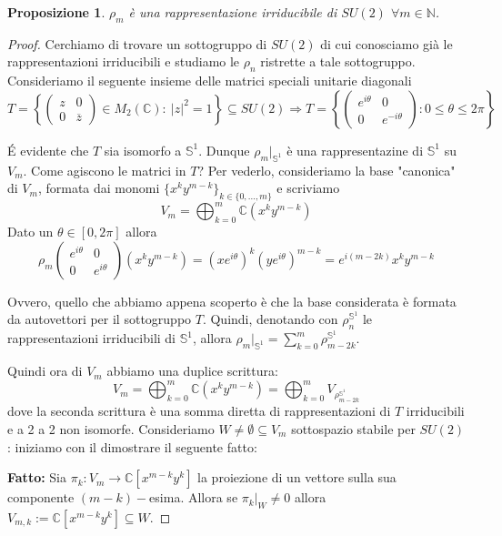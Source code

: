 \documentclass[11pt]{article}
\theoremstyle{plain}
\newtheorem{prop}[thm]{Proposizione}
\theoremstyle{definition}
\theoremstyle{remark}
\newcommand{\C}{\mathbb{C}}
\newcommand{\N}{\mathbb{N}}
\begin{document}
\begin{prop} $\rho_m$ è una rappresentazione irriducibile di $SU(2)$ $\forall m\in \N$.
\label{prop:irrid su2}
\end{prop}
\begin{proof} Cerchiamo di trovare un sottogruppo di $SU(2)$ di cui conosciamo già le rappresentazioni irriducibili e studiamo le $\rho_n$ ristrette a tale sottogruppo. Consideriamo il seguente insieme delle matrici speciali unitarie diagonali
\[T=
\left\{\begin{pmatrix}
z & 0\\
 0& \overline{z}
\end{pmatrix}\in M_2(\C):\ |z|^2=1 \right\}\subseteq SU(2)\Rightarrow T= \left\{\begin{pmatrix}
e^{i\theta}& 0\\
 0& e^{-i\theta}
\end{pmatrix}: 0\leq \theta \leq 2\pi \right\}\]

\'E evidente che $T$ sia isomorfo a $\mathbb{S}^1$. Dunque $\rho_m|_{\mathbb{S}^1}$ è una rappresentazine di $\mathbb{S}^1$ su $V_m$. Come agiscono le matrici in $T$? Per vederlo, consideriamo la base "canonica" di $V_m$, formata dai monomi $\{ x^ky^{m-k} \}_{k \in \{0, ..., m\}}$ e scriviamo
\[V_m=\bigoplus_{k=0}^m \C (x^k y^{m-k})\]
Dato un $\theta\in [0,2\pi]$ allora
\[\rho_m\begin{pmatrix}
e^{i\theta} & 0\\
 0& e^{i\theta}
\end{pmatrix} (x^ky^{m-k}) = (xe^{i\theta})^k(ye^{i\theta})^{m-k}=e^{i(m-2k)} x^k y^{m-k} \]

Ovvero, quello che abbiamo appena scoperto è che la base considerata è formata da autovettori per il sottogruppo $T$. Quindi, denotando con $\rho_n^{\mathbb{S}^1}$ le rappresentazioni irriducibili di $\mathbb{S}^1$, allora $\rho_m|_{\mathbb{S}^1}=\sum_{k=0}^{m}\rho_{m-2k}^{\mathbb{S}^1}$.

Quindi ora di $V_m$ abbiamo una duplice scrittura:
\[V_m=\bigoplus_{k=0}^m \C (x^k y^{m-k})=\bigoplus_{k=0}^m V_{\rho_{m-2k}^{\mathbb{S}^1}}\]
dove la seconda scrittura è una somma diretta di rappresentazioni di $T$ irriducibili e a 2 a 2 non isomorfe. Consideriamo $W\neq \emptyset \subseteq V_m$ sottospazio stabile per $SU(2)$: iniziamo con il dimostrare il seguente fatto:

\textbf{Fatto:} Sia $\pi_k:V_m\rightarrow \C [x^{m-k}y^k]$ la proiezione di un vettore sulla sua componente $(m-k)-$esima. Allora se $\pi_k|_W\neq 0$ allora $V_{m,k}:=\C[ x^{m-k}y^k]\subseteq W$.


\end{proof}
\end{document}
